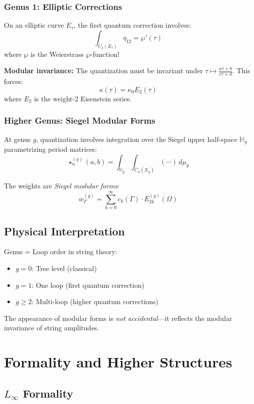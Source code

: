 \subsubsection{Genus 1: Elliptic Corrections}

On an elliptic curve $E_\tau$, the first quantum correction involves:
$$\int_{\overline{C}_2(E_\tau)} \eta_{12} = \wp'(\tau)$$
where $\wp$ is the Weierstrass $\wp$-function!

\textbf{Modular invariance:}
The quantization must be invariant under $\tau \mapsto \frac{a\tau+b}{c\tau+d}$. This forces:
$$\kappa(\tau) = \kappa_0 E_2(\tau)$$
where $E_2$ is the weight-2 Eisenstein series.

\subsubsection{Higher Genus: Siegel Modular Forms}

At genus $g$, quantization involves integration over the Siegel upper half-space $\mathbb{H}_g$ parametrizing period matrices:
$$\star^{(g)}_n(a,b) = \int_{\mathbb{H}_g} \int_{\overline{C}_n(X_g)} (\cdots) \, d\mu_g$$

The weights are \emph{Siegel modular forms}:
$$w_\Gamma^{(g)} = \sum_{k=0}^\infty c_k(\Gamma) \cdot E_{2k}^{(g)}(\Omega)$$

\subsection{Physical Interpretation}

Genus = Loop order in string theory:
\begin{itemize}
\item $g=0$: Tree level (classical)
\item $g=1$: One loop (first quantum correction)
\item $g \geq 2$: Multi-loop (higher quantum corrections)
\end{itemize}

The appearance of modular forms is \emph{not accidental}—it reflects the modular invariance of string amplitudes.

\section{Formality and Higher Structures}

\subsection{$L_\infty$ Formality}


